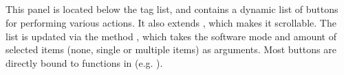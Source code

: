 \subsection{}
\def\kapitelautor{Erik Ritschl}
\label{subsec:mod:contextpanel}

This panel is located below the tag list, and contains a dynamic list of
buttons for performing various actions. It also extends
 \cite{wxScrolledWindow}, which makes it scrollable. The list is updated via
the method , which takes the software mode and amount of
selected items (none, single or multiple items) as arguments. Most buttons are
directly bound to functions in  (e.g.
).
